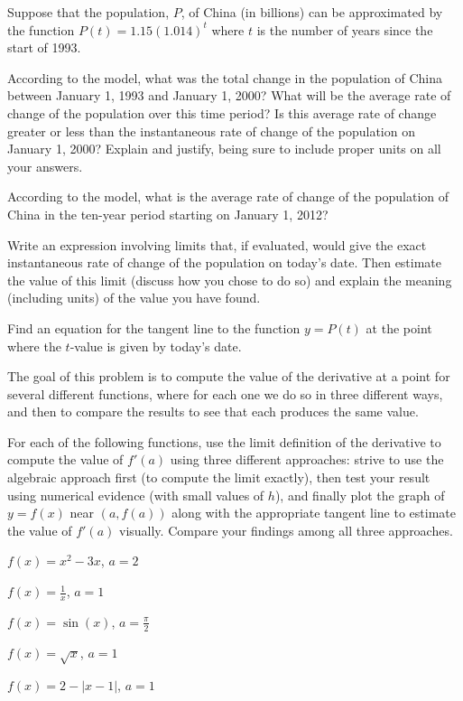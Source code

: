 \begin{exercises}
\item Suppose that the population, $P$, of China (in billions) can be approximated by the function $P(t) = 1.15(1.014)^t$ where $t$ is the number of years since the start of 1993.
   \ba
   	\item According to the model, what was the total change in the population of China between January 1, 1993 and January 1, 2000?  What will be the average rate of change of the population over this time period?  Is this average rate of change greater or less than the instantaneous rate of change of the population on January 1, 2000?  Explain and justify, being sure to include proper units on all your answers.
	\item According to the model, what is the average rate of change of the population of China in the ten-year period starting on January 1, 2012?
	\item Write an expression involving limits that, if evaluated, would give the exact instantaneous rate of change of the population on today's date.  Then estimate the value of this limit (discuss how you chose to do so) and explain the meaning (including units) of the value you have found.
	\item Find an equation for the tangent line to the function $y = P(t)$ at the point where the $t$-value is given by today's date.  
   \ea

\item The goal of this problem is to compute the value of the derivative at a point for several different functions, where for each one we do so in three different ways, and then to compare the results to see that each produces the same value.

For each of the following functions, use the limit definition of the derivative to compute the value of $f'(a)$ using three different approaches:  strive to use the algebraic approach first (to compute the limit exactly), then test your result using numerical evidence (with small values of $h$), and finally plot the graph of $y = f(x)$ near $(a,f(a))$ along with the appropriate tangent line to estimate the value of $f'(a)$ visually.  Compare your findings among all three approaches.

	\ba
		\item $f(x) = x^2 - 3x$, $a = 2$
		\item $f(x) = \frac{1}{x}$, $a = 1$
		\item $f(x) = \sin(x)$, $a = \frac{\pi}{2}$
		\item $f(x) = \sqrt{x}$, $a = 1$
		\item $f(x) = 2 - |x-1|$, $a = 1$
	\ea

\end{exercises}
\afterexercises